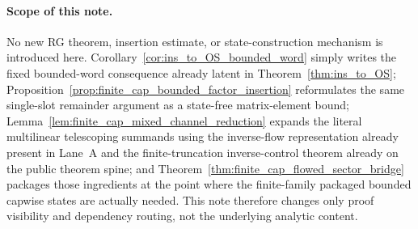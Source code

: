 \paragraph{Scope of this note.}
No new RG theorem, insertion estimate, or state-construction mechanism is introduced here.
Corollary~\ref{cor:ins_to_OS_bounded_word} simply writes the fixed bounded-word consequence already latent in Theorem~\ref{thm:ins_to_OS}; Proposition~\ref{prop:finite_cap_bounded_factor_insertion} reformulates the same single-slot remainder argument as a state-free matrix-element bound; Lemma~\ref{lem:finite_cap_mixed_channel_reduction} expands the literal multilinear telescoping summands using the inverse-flow representation already present in Lane~A and the finite-truncation inverse-control theorem already on the public theorem spine; and Theorem~\ref{thm:finite_cap_flowed_sector_bridge} packages those ingredients at the point where the finite-family packaged bounded capwise states are actually needed.
This note therefore changes only proof visibility and dependency routing, not the underlying analytic content.


